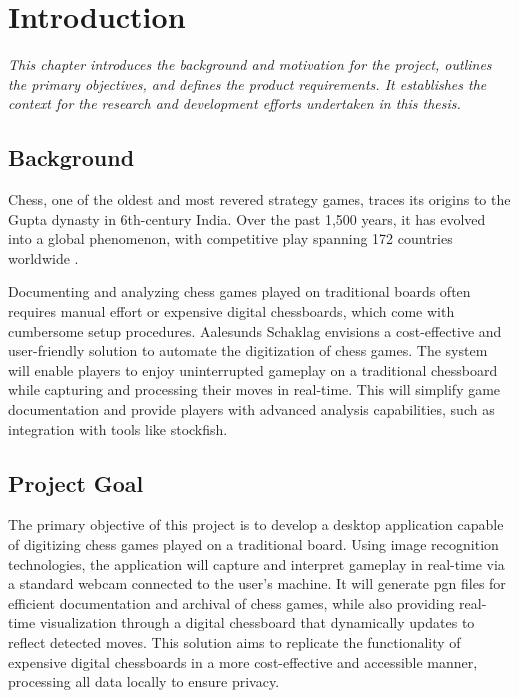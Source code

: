 \chapter{Introduction}

\begin{center} \textit{This chapter introduces the background and motivation for the project, outlines the primary objectives, and defines the product requirements. It establishes the context for the research and development efforts undertaken in this thesis.}
\end{center}

\section{Background}

Chess, one of the oldest and most revered strategy games, traces its origins to the Gupta dynasty in 6th-century India. Over the past 1,500 years, it has evolved into a global phenomenon, with competitive play spanning 172 countries worldwide \cite{artsnculture}. \

Documenting and analyzing chess games played on traditional boards often requires manual effort or expensive digital chessboards, which come with cumbersome setup procedures. Aalesunds Schaklag envisions a cost-effective and user-friendly solution to automate the digitization of chess games.  The system will enable players to enjoy uninterrupted gameplay on a traditional chessboard while capturing and processing their moves in real-time. This will simplify game documentation and provide players with advanced analysis capabilities, such as integration with tools like \gls{stockfish}.

\section{Project Goal}

The primary objective of this project is to develop a desktop application capable of digitizing chess games played on a traditional board. Using image recognition technologies, the application will capture and interpret gameplay in real-time via a standard webcam connected to the user's machine. It will generate \gls{pgn} files for efficient documentation and archival of chess games, while also providing real-time visualization through a digital chessboard that dynamically updates to reflect detected moves. This solution aims to replicate the functionality of expensive digital chessboards in a more cost-effective and accessible manner, processing all data locally to ensure privacy.

